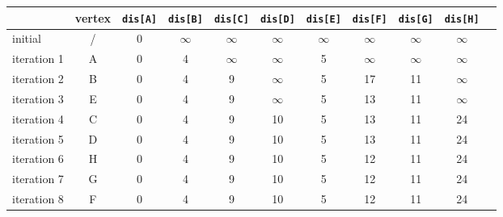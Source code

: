 \begin{table}[htbp]
    \begin{center}
        \begin{tabular}{|l|c|c|c|c|c|c|c|c|c| p{3cm}|}
            \hline
                        & vertex & \texttt{dis[A]} & \texttt{dis[B]} & \texttt{dis[C]} & \texttt{dis[D]} & \texttt{dis[E]} & \texttt{dis[F]} & \texttt{dis[G]} & \texttt{dis[H]} \\ \hline
            initial     & /      & 0               & $\infty$        & $\infty$        & $\infty$        & $\infty$        & $\infty$        & $\infty$        & $\infty$        \\ \hline

            iteration 1 & A      & 0               & 4               & $\infty$        & $\infty$        & 5               & $\infty$        & $\infty$        & $\infty$        \\ \hline
            iteration 2 & B      & 0               & 4               & 9               & $\infty$        & 5               & 17              & 11              & $\infty$        \\ \hline
            iteration 3 & E      & 0               & 4               & 9               & $\infty$        & 5               & 13              & 11              & $\infty$        \\ \hline
            iteration 4 & C      & 0               & 4               & 9               & 10              & 5               & 13              & 11              & 24              \\ \hline
            iteration 5 & D      & 0               & 4               & 9               & 10              & 5               & 13              & 11              & 24              \\ \hline
            iteration 6 & H      & 0               & 4               & 9               & 10              & 5               & 12              & 11              & 24              \\ \hline
            iteration 7 & G      & 0               & 4               & 9               & 10              & 5               & 12              & 11              & 24              \\ \hline
            iteration 8 & F      & 0               & 4               & 9               & 10              & 5               & 12              & 11              & 24              \\ \hline
        \end{tabular}
    \end{center}
\end{table}
